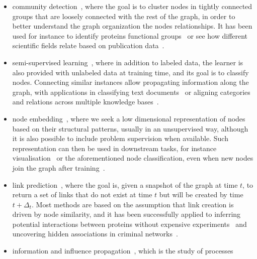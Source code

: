 \begin{itemize}[nosep,leftmargin=*]
  \item community detection~\autocite{FortunatoSurvey10}, where the goal is to cluster nodes in
    tightly connected groups that are loosely connected with the rest of the graph, in order to
    better understand the graph organization the nodes relationships. It has been used for instance
    to identify proteins functional groups~\autocite{clusterBio03} or see how different scientific
    fields relate based on publication data~\autocite{clusterScience08}.
  \item semi-supervised learning~\autocites{SSL06}{graphSSL14}, where in addition to labeled data,
    the learner is also provided with unlabeled data at training time, and its goal is to classify
    nodes. Connecting similar instances
    allow propagating information along the graph, with applications in classifying text
    documents~\autocite{sslText09} or aligning categories and relations across multiple knowledge
    bases~\autocite{sslKB13}.
  \item node embedding~\autocite{representationLearning17}, where we seek a low dimensional
    representation of nodes based on their structural patterns, usually in an unsupervised way,
    although it is also possible to include problem supervision when available. Such representation can
    then be used in downstream tasks, for instance visualisation~\autocite{LINE15} or the
    aforementioned node classification, even when new nodes join the graph after
    training~\autocite{inductiveRepresentation17}.
  \item link prediction~\autocite{linkPredSurvey16}, where the goal is, given a snapshot of the
    graph at time $t$, to return a set of links that do not exist at time $t$ but will be created by time
    $t+\Delta_t$. Most methods are based on the assumption that link creation is driven by node
    similarity, and it has been successfully applied to inferring potential interactions between
    proteins without expensive experiments~\autocite{linkPredBio06} and uncovering hidden
    associations in criminal networks~\autocite{linkPredCrime08}.
  \item information and influence propagation~\autocite{infmax13}, which is the study of processes

\end{itemize}
